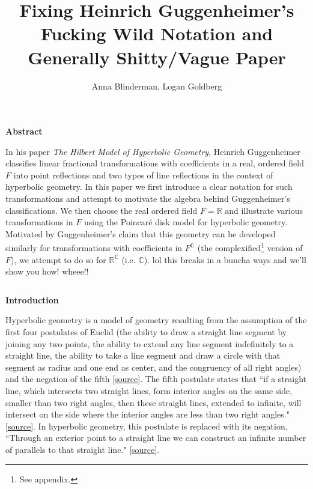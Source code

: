\documentclass[12pt]{article}
\title{Fixing Heinrich Guggenheimer's Fucking Wild Notation and Generally Shitty/Vague Paper}
\author{Anna Blinderman, Logan Goldberg}
\date{}
\newcommand{\R}{\mathbb{R}}
\newcommand{\C}{\mathbb{C}}
\newcommand{\fc}{F^{\C}}
\newcommand{\poincare}{Poincar\'{e} }
\theoremstyle{plain}
\theoremstyle{definition}
\begin{document}
\maketitle

\newcommand{\wtflatex}[1]{\noindent\begin{Large}\textbf{{#1}}\end{Large}\vspace{3mm}}







\wtflatex{Abstract}

In his paper \textit{The Hilbert Model of Hyperbolic Geometry}, Heinrich Guggenheimer classifies linear fractional transformations with coefficients in a real, ordered field $F$ into point reflections and two types of line reflections in the context of hyperbolic geometry. In this paper we first introduce a clear notation for such transformations and attempt to motivate the algebra behind Guggenheimer's classifications. We then choose the real ordered field $F = \R$ and illustrate various transformations in $F$ using the \poincare disk model for hyperbolic geometry. Motivated by Guggenheimer's claim that this geometry can be developed similarly for transformations with coefficients in $\fc$ (the complexified\footnote{See appendix.} version of $F$), we attempt to do so for $\R^{\C}$ (i.e. $\C$). lol this breaks in a buncha ways and we'll show you how! wheee!! 









\[\]\wtflatex{Introduction}

Hyperbolic geometry is a model of geometry resulting from the assumption of the first four postulates of Euclid (the ability to draw a straight line segment by joining any two points, the ability to extend any line segment indefinitely to a straight line, the ability to take a line segment and draw a circle with that segment as radius and one end as center, and the congruency of all right angles) and the negation of the fifth \href{http://mathworld.wolfram.com/EuclidsPostulates.html}{[source]}. The fifth postulate states that ``if a straight line, which intersects two straight lines, form interior angles on the same side, smaller than two right angles, then these straight lines, extended to infinite, will intersect on the side where the interior angles are less than two right angles." [\href{https://pdfs.semanticscholar.org/ed0e/d1fee9bbe60b24be373ac1207d17ecb90b4a.pdf}{source}]. In hyperbolic geometry, this postulate is replaced with its negation, ``Through an exterior point to a straight line we can construct an infinite number of parallels to that straight line." \href{https://pdfs.semanticscholar.org/ed0e/d1fee9bbe60b24be373ac1207d17ecb90b4a.pdf}{[source]}.
	
\end{document}
